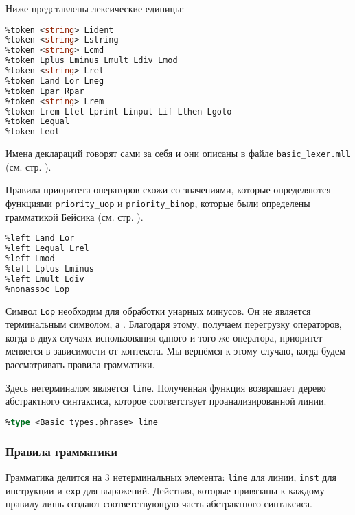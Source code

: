 Ниже представлены лексические единицы:

\begin{lstlisting}[language=Caml]
%token <int> Lint
%token <string> Lident
%token <string> Lstring
%token <string> Lcmd
%token Lplus Lminus Lmult Ldiv Lmod
%token <string> Lrel
%token Land Lor Lneg
%token Lpar Rpar
%token <string> Lrem
%token Lrem Llet Lprint Linput Lif Lthen Lgoto
%token Lequal
%token Leol
\end{lstlisting}

Имена деклараций говорят сами за себя и они описаны в файле
\texttt{basic\_lexer.mll} (см. стр. \pageref{??}).

Правила приоритета операторов схожи со значениями, которые определяются
функциями \texttt{priority\_uop} и \texttt{priority\_binop}, которые были
определены грамматикой Бейсика (см. стр. \pageref{??}).

\begin{lstlisting}[language=Caml]
%right Lneg
%left Land Lor
%left Lequal Lrel
%left Lmod
%left Lplus Lminus
%left Lmult Ldiv
%nonassoc Lop
\end{lstlisting}

Символ \texttt{Lop} необходим для обработки унарных минусов. Он не является
терминальным символом, а . Благодаря этому, получаем
перегрузку операторов, когда в двух случаях использования одного и того же
оператора, приоритет меняется в зависимости от контекста. Мы вернёмся к этому
случаю, когда будем рассматривать правила грамматики.

Здесь нетерминалом является \texttt{line}. Полученная функция возвращает дерево
абстрактного синтаксиса, которое соответствует проанализированной линии.

\begin{lstlisting}[language=Caml]
%start line
%type <Basic_types.phrase> line
\end{lstlisting}

\subsubsection{Правила грамматики}

Грамматика делится на 3 нетерминальных элемента: \texttt{line} для линии,
\texttt{inst} для инструкции и \texttt{exp} для выражений. Действия, которые
привязаны к каждому правилу лишь создают соответствующую часть абстрактного
синтаксиса.

